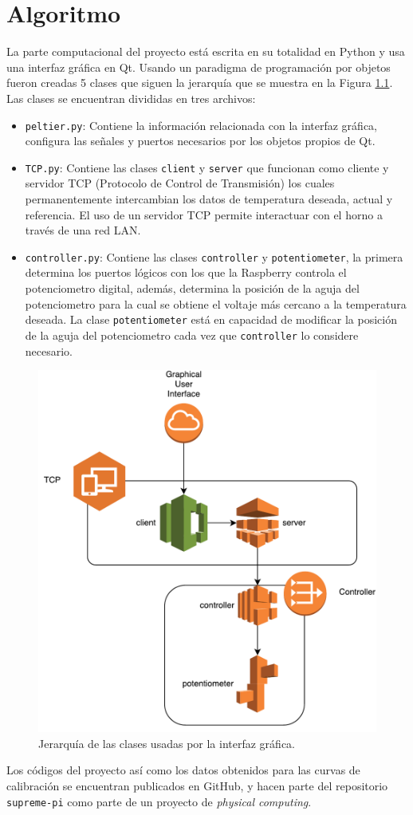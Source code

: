 \documentclass{wileysix}
\begin{document}
\chapter{Algoritmo}
La parte computacional del proyecto est\'a escrita en su totalidad en Python y usa una interfaz gr\'afica en Qt. Usando un paradigma de programaci\'on por objetos fueron creadas 5 clases que siguen la jerarqu\'ia que se muestra en la Figura \ref{fig: diagram}. Las clases se encuentran divididas en tres archivos:
\begin{itemize}
	\item \verb|peltier.py|: Contiene la informaci\'on relacionada con la interfaz gr\'afica, configura las se\~nales y puertos necesarios por los objetos propios de Qt.
	
	\item \verb|TCP.py|: Contiene las clases \verb|client| y \verb|server| que funcionan como cliente y servidor TCP (Protocolo de Control de Transmisi\'on) los cuales permanentemente intercambian los datos de temperatura deseada, actual y referencia. El uso de un servidor TCP permite interactuar con el horno a trav\'es de una red LAN.
	\item \verb|controller.py|: Contiene las clases \verb|controller| y \verb|potentiometer|, la primera determina los puertos l\'ogicos con los que la Raspberry controla el potenciometro digital, adem\'as, determina la posici\'on de la aguja del potenciometro para la cual se obtiene el voltaje m\'as cercano a la temperatura deseada. La clase \verb|potentiometer| est\'a en capacidad de modificar la posici\'on de la aguja del potenciometro cada vez que \verb|controller| lo considere necesario.
\end{itemize}
\begin{figure}[h]
	\centering
	\includegraphics[width=0.7\linewidth]{extras/diagram.pdf}
	\caption{Jerarqu\'ia de las clases usadas por la interfaz gr\'afica.}
	\label{fig: diagram}
\end{figure} 

\vfill
Los c\'odigos del proyecto as\'i como los datos obtenidos para las curvas de calibraci\'on se encuentran publicados en GitHub, y hacen parte del repositorio \verb|supreme-pi| como parte de un proyecto de \textit{physical computing}.
\end{document}
